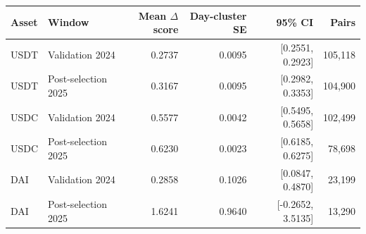 \begin{tabular}{llrrrr}
\toprule
Asset & Window & Mean $\Delta$ score & Day-cluster SE & 95\% CI & Pairs\\
\midrule
USDT & Validation 2024 & 0.2737 & 0.0095 & [0.2551, 0.2923] & 105,118 \tabularnewline
USDT & Post-selection 2025 & 0.3167 & 0.0095 & [0.2982, 0.3353] & 104,900 \tabularnewline
USDC & Validation 2024 & 0.5577 & 0.0042 & [0.5495, 0.5658] & 102,499 \tabularnewline
USDC & Post-selection 2025 & 0.6230 & 0.0023 & [0.6185, 0.6275] & 78,698 \tabularnewline
DAI & Validation 2024 & 0.2858 & 0.1026 & [0.0847, 0.4870] & 23,199 \tabularnewline
DAI & Post-selection 2025 & 1.6241 & 0.9640 & [-0.2652, 3.5135] & 13,290 \tabularnewline
\bottomrule
\end{tabular}
